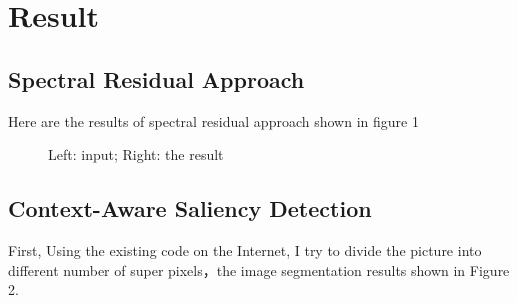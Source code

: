 \documentclass[10pt,twocolumn,letterpaper]{article}
\begin{document}
\section{Result}
\subsection{Spectral Residual Approach}
\indent \indent  Here are the results of spectral residual approach shown in figure 1
\begin{figure}[h]
	\centering
   \caption{ Left: input; Right: the result}
   
  
\end{figure}
 \subsection{Context-Aware Saliency Detection}
 First, Using the existing code on the Internet, I try to divide the picture into different number of super pixels，the image segmentation results shown in Figure 2.\\
\end{document}
